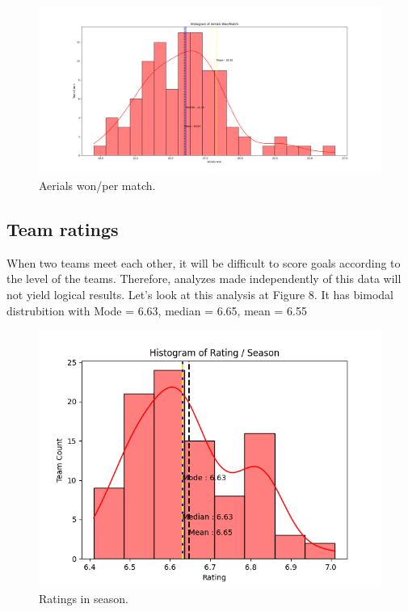 \documentclass[conference]{IEEEtran}
\begin{document}
\begin{figure}[h]
  \includegraphics[width=\linewidth]{AerialsWon.png}
  \caption{Aerials won/per match.}
  \label{fig:aerial}
\end{figure}

\subsection{Team ratings}
When two teams meet each other, it will be difficult to score goals according to the level of the teams. Therefore, analyzes made independently of this data will not yield logical results. Let's look at this analysis at Figure 8. It has bimodal distrubition with Mode = 6.63, median = 6.65, mean = 6.55

\begin{figure}[h]
  \includegraphics[width=\linewidth]{Rating.png}
  \caption{Ratings in season.}
  \label{fig:rate}
\end{figure}
\end{document}
